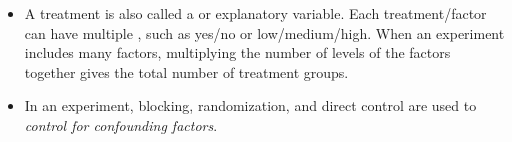 \begin{itemize}
\item A treatment is also called a  or explanatory variable.  Each treatment/factor can have multiple , such as yes/no or low/medium/high.  When an experiment includes many factors, multiplying the number of levels of the factors together gives the total number of treatment groups.  

\item In an experiment, blocking, randomization, and direct control are used to \textit{control for confounding factors}.

\end{itemize}


{}

\reviewchapterheader{}

